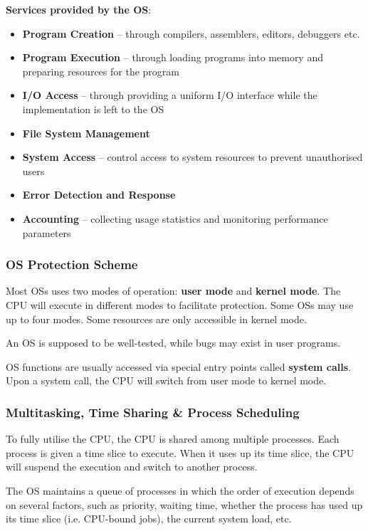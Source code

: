 \textbf{Services provided by the OS}:
\begin{itemize}
    \item \textbf{Program Creation} -- through compilers, assemblers, editors, debuggers etc.
    \item \textbf{Program Execution} -- through loading programs into memory and preparing resources for the program
    \item \textbf{I/O Access} -- through providing a uniform I/O interface while the implementation is left to the OS
    \item \textbf{File System Management}
    \item \textbf{System Access} -- control access to system resources to prevent unauthorised users
    \item \textbf{Error Detection and Response}
    \item \textbf{Accounting} -- collecting usage statistics and monitoring performance parameters
\end{itemize}

\subsubsection{OS Protection Scheme}

Most OSs uses two modes of operation: \textbf{user mode} and \textbf{kernel mode}.
The CPU will execute in different modes to facilitate protection. Some OSs may use up
to four modes. Some resources are only accessible in kernel mode.

An OS is supposed to be well-tested, while bugs may exist in user programs.

OS functions are usually accessed via special entry points called \textbf{system calls}.
Upon a system call, the CPU will switch from user mode to kernel mode.

\subsubsection{Multitasking, Time Sharing \& Process Scheduling}

To fully utilise the CPU, the CPU is shared among multiple processes. Each process
is given a time slice to execute. When it uses up its time slice, the CPU will
suspend the execution and switch to another process.

The OS maintains a queue of processes in which the order of execution depends on
several factors, such as priority, waiting time, whether the process has used up
its time slice (i.e. CPU-bound jobs), the current system load, etc.

